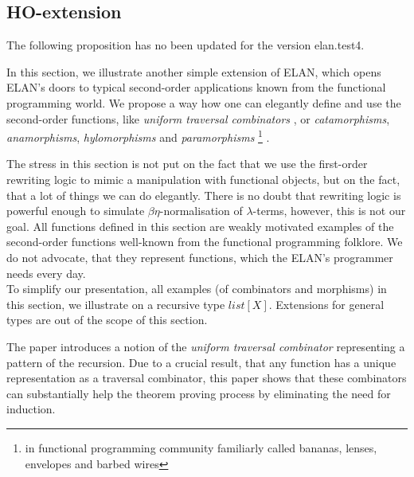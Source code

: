\documentclass{article}
\begin{document}
\subsection{HO-extension}

The following proposition has no been updated for the version elan.test4.

{\scriptsize
In this section, we illustrate another simple extension of ELAN,
which opens ELAN's doors to typical second-order applications
known from the functional programming world.
We propose a way how one can elegantly define and use the
second-order functions,
like {\em uniform traversal combinators} \cite{COMBIN-CADE-11},
or
{\em catamorphisms},
{\em anamorphisms},
{\em hylomorphisms} and
{\em paramorphisms} \footnote{
in functional programming community familiarly called
bananas, lenses, envelopes and barbed wires} \cite{Bananas}.

The stress in this section is not put on the fact that we use
the first-order rewriting logic to mimic a manipulation with
functional objects, but on the fact, that a lot of things we can
do elegantly. There is no doubt that rewriting logic is powerful
enough to simulate $\beta\eta$-normalisation of $\lambda$-terms,
however, this is not our goal.
All functions defined in this section are weakly motivated
examples of the second-order functions well-known from
the functional programming folklore. We do not advocate, that
they represent functions, which the ELAN's programmer needs
every day. \\
To simplify our presentation,
all examples (of combinators and morphisms) in this section,
we illustrate on a recursive type $list[X]$.
Extensions for general types are out of the scope of this section.

The paper \cite{COMBIN-CADE-11} introduces a notion of the
{\em uniform traversal combinator} representing a pattern of
the recursion.  Due to a crucial result,
that any function has a unique representation as a
traversal combinator, this paper shows that these combinators
can substantially help the theorem proving process by
eliminating the need for induction.

}
\end{document}
